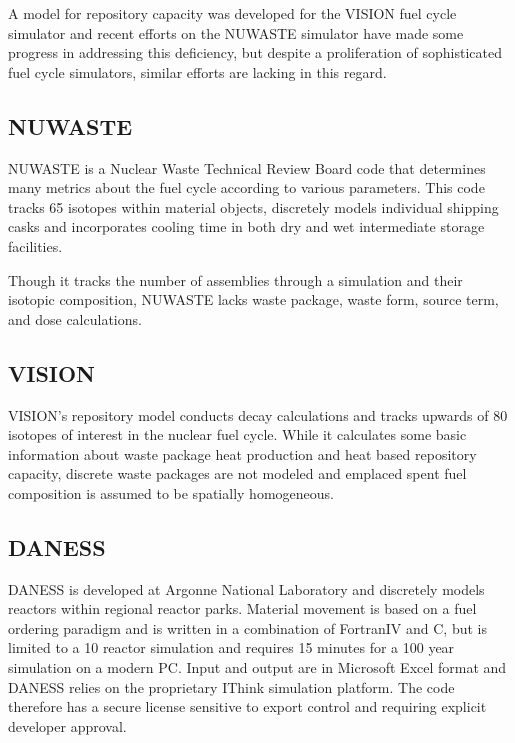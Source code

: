A model for repository capacity was developed for the \gls{VISION} fuel cycle
simulator \cite{yacout_visionverifiable_2006} \cite{radel_repository_2007} and
recent efforts on the NUWASTE simulator \cite{ abkowitz_nuclear_2010} have made
some progress in addressing this deficiency, but despite a proliferation of
sophisticated fuel cycle simulators, similar efforts are lacking in this
regard. 



\subsection{NUWASTE} 

\gls{NUWASTE} is a Nuclear Waste Technical Review Board code that determines
many metrics about the fuel cycle according to various parameters.
\cite{abkowitz_nuclear_2010} This code tracks 65 isotopes within material
objects, discretely models individual shipping casks and incorporates cooling
time in both dry and wet intermediate storage facilities.

Though it tracks the number of assemblies through a simulation and their 
isotopic composition, \gls{NUWASTE} lacks waste package, waste form, source 
term, and dose calculations.

\subsection{VISION} 

\gls{VISION}'s repository model conducts decay calculations
and tracks upwards of 80 isotopes of interest in the nuclear fuel cycle.
\cite{yacout_visionverifiable_2006} While it calculates some basic information 
about waste package heat production and heat based repository capacity, discrete  
waste packages are not modeled and emplaced spent fuel composition is assumed to  
be spatially homogeneous. \cite{radel_simulation_2005}
\cite{boucher_international_2010}

\subsection{DANESS} 

\gls{DANESS} is developed at Argonne National Laboratory and
discretely models reactors within regional reactor parks. Material movement
is based on a fuel ordering paradigm and is written in a combination of
FortranIV and C, but is limited to a 10 reactor simulation and requires 
15 minutes for a 100 year simulation on a modern PC.  Input and output are 
in Microsoft Excel format and \gls{DANESS} relies on the proprietary IThink 
simulation platform. The code therefore has a secure license sensitive to 
export control and requiring explicit developer approval. 
\cite{yacout_daness_2011,van_den_durpel_daness:_2006} 


